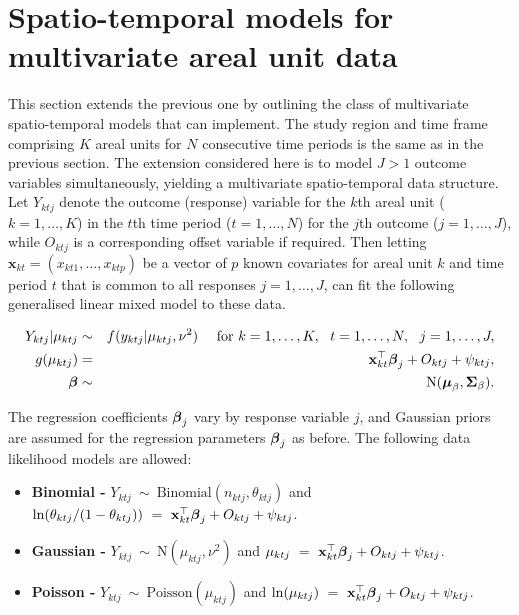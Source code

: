 \documentclass[article, nojss]{jss}
\newcommand{\bd}[1]{\ensuremath{\mbox{\boldmath $#1$}}}
\begin{document}
\section{Spatio-temporal models for multivariate areal unit data}\label{section3}
This section extends the previous one by outlining the class of multivariate spatio-temporal models that  can implement. The study region and time frame comprising $K$ areal units for $N$ consecutive time periods is the same as in the previous section. The extension considered here is to model $J>1$ outcome variables simultaneously, yielding a multivariate spatio-temporal data structure. Let $Y_{ktj}$ denote the outcome (response) variable for the $k$th areal unit ($k=1,\ldots,K$) in the $t$th time period ($t=1,\ldots,N$) for the $j$th outcome ($j=1,\ldots,J$), while $O_{ktj}$ is a corresponding offset variable if required. Then letting $\mathbf{x}_{kt}=(x_{kt1},\ldots, x_{ktp})$ be a vector of $p$ known covariates for areal unit $k$ and time period $t$ that is common to all responses $j=1,\ldots,J$,  can fit the following generalised linear mixed model to these data.

\begin{eqnarray}
Y_{ktj}|\mu_{ktj}&\sim&f(y_{ktj}|\mu_{ktj},\nu^{2})~~~~\mbox{for }k=1,\ldots,K,~~t=1,\ldots,N,~~j=1,\ldots,J,\label{equation likelihood2}\\
g(\mu_{ktj})&=&\mathbf{x}_{kt}^{\top}\bd{\beta}_j + O_{ktj} + \psi_{ktj},\nonumber\\
\bd{\beta}&\sim&\mbox{N}(\bd{\mu}_{\beta}, \bd{\Sigma}_{\beta}).\nonumber
\end{eqnarray}

The regression coefficients $\bd{\beta}_j$ vary by response variable $j$, and Gaussian priors are assumed for the regression parameters $\bd{\beta}_j$ as before. The following data likelihood models are allowed:

\begin{itemize}
\item \textbf{Binomial - } $Y_{ktj}~\sim~\mbox{Binomial}(n_{ktj}, \theta_{ktj})$ and $\ln(\theta_{ktj}/(1-\theta_{ktj}))~=~\mathbf{x}_{kt}^{\top}\bd{\beta}_j + O_{ktj} + \psi_{ktj}$. 

\item \textbf{Gaussian - } $Y_{ktj}~\sim~\mbox{N}(\mu_{ktj}, \nu^2)$ and $\mu_{ktj}~=~\mathbf{x}_{kt}^{\top}\bd{\beta}_j + O_{ktj} + \psi_{ktj}$.

\item \textbf{Poisson - } $Y_{ktj}~\sim~\mbox{Poisson}(\mu_{ktj})$ and $\ln(\mu_{ktj})~=~\mathbf{x}_{kt}^{\top}\bd{\beta}_j + O_{ktj} + \psi_{ktj}$. 
\end{itemize}
\end{document}
